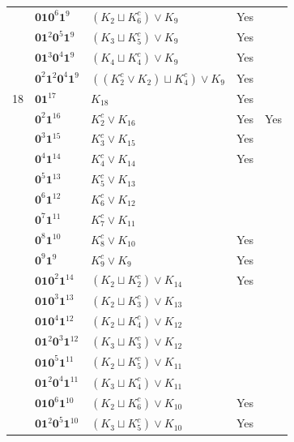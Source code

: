 \documentclass[preprint]{elsarticle}
\begin{document}
\begin{center}
\begin{longtable}{p{0.7cm} p{2cm} p{4cm} p{1cm} p{0cm}}
&$\mathbf{0}\mathbf{1}\mathbf{0}^6 \mathbf{1}^9$ & $ (K_{2} \sqcup K_{6}^c )\vee K_{9}$ &Yes &\\
&$\mathbf{0}\mathbf{1}^2 \mathbf{0}^5 \mathbf{1}^9$ & $( K_{3} \sqcup K_{5}^c )\vee K_{9}$ &Yes &\\
&$\mathbf{0}\mathbf{1}^3 \mathbf{0}^4 \mathbf{1}^9$ & $( K_{4} \sqcup K_{4}^c )\vee K_{9}$ &Yes &\\
&$\mathbf{0}^2 \mathbf{1}^2 \mathbf{0}^4 \mathbf{1}^{9}$ & $(( K_{2}^c \vee K_{2}) \sqcup K_{4}^c )\vee K_{9}$ &Yes &\\
\hline 
18&$\mathbf{0}\mathbf{1}^{17}$ & $ K_{18}$ &Yes &\\
&$\mathbf{0}^2 \mathbf{1}^{16}$ & $ K_{2}^c \vee K_{16}$ &Yes &Yes\\
&$\mathbf{0}^3 \mathbf{1}^{15}$ & $ K_{3}^c \vee K_{15}$ &Yes &\\
&$\mathbf{0}^4 \mathbf{1}^{14}$ & $ K_{4}^c \vee K_{14}$ &Yes &\\
&$\mathbf{0}^5 \mathbf{1}^{13}$ & $ K_{5}^c \vee K_{13}$ & &\\
&$\mathbf{0}^6 \mathbf{1}^{12}$ & $ K_{6}^c \vee K_{12}$ & &\\
&$\mathbf{0}^7 \mathbf{1}^{11}$ & $ K_{7}^c \vee K_{11}$ & &\\
&$\mathbf{0}^8 \mathbf{1}^{10}$ & $ K_{8}^c \vee K_{10}$ &Yes &\\
&$\mathbf{0}^9 \mathbf{1}^9$ & $ K_{9}^c \vee K_{9}$ &Yes &\\
&$\mathbf{0}\mathbf{1}\mathbf{0}^2 \mathbf{1}^{14}$ & $ (K_{2} \sqcup K_{2}^c) \vee K_{14}$ &Yes &\\
&$\mathbf{0}\mathbf{1}\mathbf{0}^3 \mathbf{1}^{13}$ & $ (K_{2} \sqcup K_{3}^c )\vee K_{13}$ & &\\
&$\mathbf{0}\mathbf{1} \mathbf{0}^4 \mathbf{1}^{12}$ & $ (K_{2} \sqcup K_{4}^c )\vee K_{12}$ & &\\
&$\mathbf{0}\mathbf{1}^2 \mathbf{0}^3 \mathbf{1}^{12}$ & $( K_{3} \sqcup K_{3}^c) \vee K_{12}$ & &\\
&$\mathbf{0}\mathbf{1} \mathbf{0}^5 \mathbf{1}^{11}$ & $ (K_{2} \sqcup K_{5}^c )\vee K_{11}$ & &\\
&$\mathbf{0}\mathbf{1}^2 \mathbf{0}^4 \mathbf{1}^{11}$ & $( K_{3} \sqcup K_{4}^c) \vee K_{11}$ & &\\
&$\mathbf{0}\mathbf{1} \mathbf{0}^6 \mathbf{1}^{10}$ & $ (K_{2} \sqcup K_{6}^c )\vee K_{10}$ &Yes &\\
&$\mathbf{0}\mathbf{1}^2 \mathbf{0}^5 \mathbf{1}^{10}$ & $( K_{3} \sqcup K_{5}^c) \vee K_{10}$ &Yes &\\

\end{longtable}
\end{center}
\end{document}
